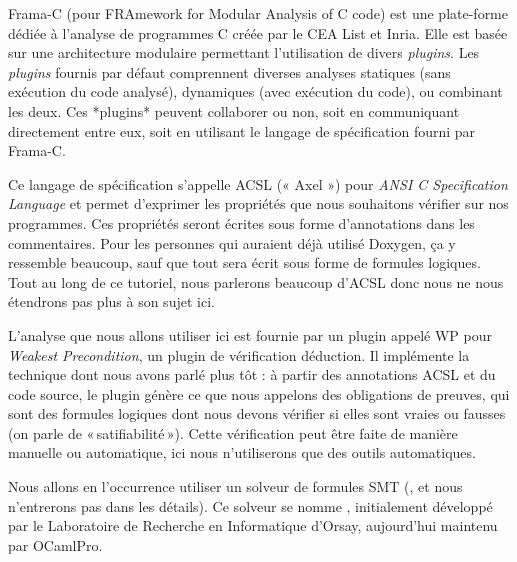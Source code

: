 





Frama-C (pour FRAmework for Modular Analysis of C code) est une plate-forme
 dédiée à l'analyse de programmes C créée par le CEA List et Inria. Elle est
 basée sur une architecture modulaire permettant l'utilisation de divers
 {\it plugins}. Les {\it plugins} fournis par défaut comprennent diverses
 analyses statiques (sans exécution du code analysé), dynamiques (avec
 exécution du code), ou combinant les deux. Ces *plugins* peuvent collaborer
 ou non, soit en communiquant directement entre eux, soit en utilisant le
 langage de spécification fourni par Frama-C.



Ce langage de spécification s'appelle ACSL (« Axel »)
pour \textit{ANSI C Specification Language} et permet d'exprimer les
propriétés que nous souhaitons vérifier sur nos programmes. Ces propriétés seront
écrites sous forme d'annotations dans les commentaires. Pour les personnes qui
auraient déjà utilisé Doxygen, ça y ressemble beaucoup, sauf que tout sera
écrit sous forme de formules logiques. Tout au long de ce tutoriel, nous parlerons
beaucoup d'ACSL donc nous ne nous étendrons pas plus à son sujet ici.



L'analyse que nous allons utiliser ici est fournie par un plugin appelé WP pour
\textit{Weakest Precondition}, un plugin de vérification déduction. Il implémente
la technique dont nous avons parlé plus tôt :
à partir des annotations ACSL et du code source, le plugin génère ce que nous
appelons des obligations de preuves, qui sont des formules logiques dont nous
devons vérifier si elles sont vraies ou fausses (on parle de « satifiabilité »).
Cette vérification peut être faite de manière
manuelle ou automatique, ici nous n'utiliserons que des outils automatiques.



Nous allons en l'occurrence utiliser un solveur de formules SMT
(,
et nous n'entrerons pas dans les détails). Ce solveur se nomme
, initialement développé par le Laboratoire
de Recherche en Informatique d'Orsay, aujourd'hui maintenu par
OCamlPro.





